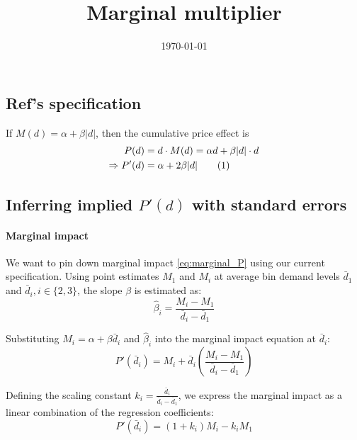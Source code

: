\documentclass[pdftex,12pt,a4paper]{article}
\newcommand\numberthis{\addtocounter{equation}{1}\tag{\theequation}}
\begin{document}
\title{Marginal multiplier}
\author{}
\date{\today}
\maketitle

\abstract \noindent 
\setlength{\parindent}{0pt}
\setlength{\parskip}{0.5\baselineskip}

\subsection{Ref's specification}

If $M(d) = \alpha + \beta |d|$, then the cumulative price effect is 
\begin{align*}
P(d) & = d \cdot M(d) = \alpha d + \beta |d| \cdot d \\
\Rightarrow P'(d) & = \alpha + 2 \beta |d| \numberthis \label{eq:marginal_P}
\end{align*}

\subsection{Inferring implied $P'(d)$ with standard errors}

\paragraph{Marginal impact}
We want to pin down marginal impact \eqref{eq:marginal_P} using our current specification. Using point estimates $M_1$ and $M_i$ at average bin demand levels $\bar{d}_1$ and $\bar{d}_i, i \in \{2,3\}$, 
the slope $\beta$ is estimated as:
\begin{equation}
\hat{\beta}_i = \frac{M_i - M_1}{\bar{d}_i - \bar{d}_1}
\end{equation}

Substituting $M_i = \alpha + \beta \bar{d}_i$ and $\hat{\beta}_i$ into the marginal impact equation at $\bar{d}_i$:
\begin{equation}
P'(\bar{d}_i) = M_i + \bar{d}_i \left( \frac{M_i - M_1}{\bar{d}_i - \bar{d}_1} \right)
\end{equation}

Defining the scaling constant $k_i = \frac{\bar{d}_i}{\bar{d}_i - \bar{d}_1}$, we express the 
marginal impact as a linear combination of the regression coefficients:
\begin{equation}
P'(\bar{d}_i) = (1 + k_i)M_i - k_i M_1
\end{equation}
\end{document}
